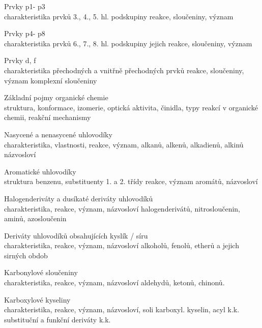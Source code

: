 \begin{boldEnum}
    \item Prvky p1- p3 \\    
    charakteristika prvků 3., 4., 5. hl. podskupiny reakce, sloučeniny, význam
    
    \item Prvky p4- p8 \\    
    charakteristika prvků 6., 7., 8. hl. podskupiny jejich reakce, sloučeniny, význam
    
    \item Prvky d, f \\    
    charakteristika přechodných a vnitřně přechodných prvků reakce, sloučeniny, význam komplexní
    sloučeniny
    
    \item Základní pojmy organické chemie \\
    struktura, konformace, izomerie, optická aktivita, činidla, typy reakcí v organické chemii, reakční
    mechanismy
    
    \item Nasycené a nenasycené uhlovodíky \\    
    charakteristika, vlastnosti, reakce, význam, alkanů, alkenů, alkadienů, alkinů názvosloví
    
    \item Aromatické uhlovodíky \\    
    struktura benzenu, substituenty 1. a 2. třídy reakce, význam aromátů, názvosloví
    
    \item Halogenderiváty a dusíkaté deriváty uhlovodíků \\
    charakteristika, reakce, význam, názvosloví halogenderivátů, nitrosloučenin, aminů, azosloučenin
    
    \item Deriváty uhlovodíků obsahujících kyslík / síru \\    
    charakteristika, reakce, význam, názvosloví alkoholů, fenolů, etherů a jejich sirných obdob
    
    \item Karbonylové sloučeniny \\    
    charakteristika, reakce, význam, názvosloví aldehydů, ketonů, chinonů.
    
    \item Karboxylové kyseliny \\    
    charakteristika, reakce, význam, názvosloví, soli karboxyl. kyselin, acyl k.k. substituční a funkční
    deriváty k.k.
    

\end{boldEnum}
